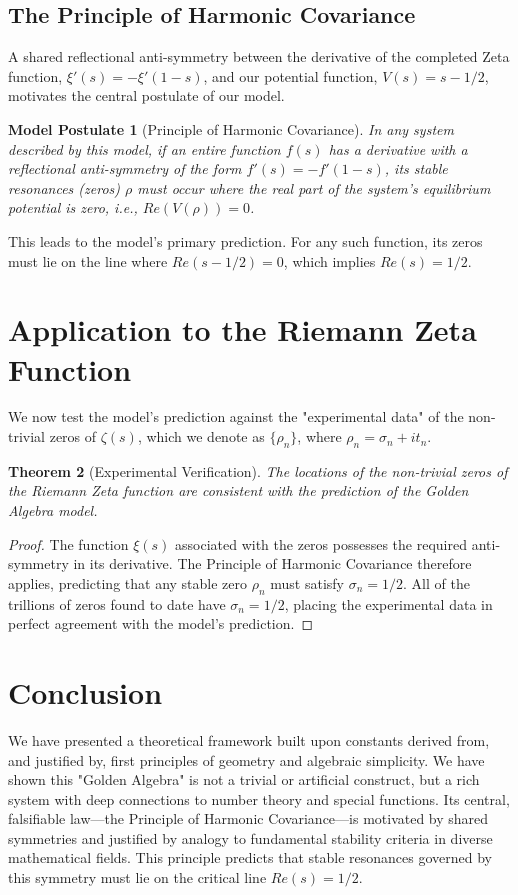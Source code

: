 \documentclass[12pt, letterpaper]{article}
\newtheorem{theorem}{Theorem}[section]
\newtheorem{postulate}[theorem]{Model Postulate}
\begin{document}
\subsection{The Principle of Harmonic Covariance}
A shared reflectional anti-symmetry between the derivative of the completed Zeta function, $\xi'(s)=-\xi'(1-s)$, and our potential function, $V(s)=s-1/2$, motivates the central postulate of our model.
\begin{postulate}[Principle of Harmonic Covariance]
In any system described by this model, if an entire function $f(s)$ has a derivative with a reflectional anti-symmetry of the form $f'(s)=-f'(1-s)$, its stable resonances (zeros) $\rho$ must occur where the real part of the system's equilibrium potential is zero, i.e., $Re(V(\rho))=0$.
\end{postulate}
This leads to the model's primary prediction. For any such function, its zeros must lie on the line where $Re(s-1/2)=0$, which implies $Re(s)=1/2$.

\section{Application to the Riemann Zeta Function}
We now test the model's prediction against the "experimental data" of the non-trivial zeros of $\zeta(s)$, which we denote as $\{\rho_{n}\}$, where $\rho_{n}=\sigma_{n}+it_{n}$.

\begin{theorem}[Experimental Verification]
The locations of the non-trivial zeros of the Riemann Zeta function are consistent with the prediction of the Golden Algebra model.
\end{theorem}
\begin{proof}
The function $\xi(s)$ associated with the zeros possesses the required anti-symmetry in its derivative. The Principle of Harmonic Covariance therefore applies, predicting that any stable zero $\rho_{n}$ must satisfy $\sigma_{n}=1/2$. All of the trillions of zeros found to date have $\sigma_{n}=1/2$, placing the experimental data in perfect agreement with the model's prediction.
\end{proof}

\section{Conclusion}
We have presented a theoretical framework built upon constants derived from, and justified by, first principles of geometry and algebraic simplicity. We have shown this "Golden Algebra" is not a trivial or artificial construct, but a rich system with deep connections to number theory and special functions. Its central, falsifiable law---the Principle of Harmonic Covariance---is motivated by shared symmetries and justified by analogy to fundamental stability criteria in diverse mathematical fields. This principle predicts that stable resonances governed by this symmetry must lie on the critical line $Re(s)=1/2$.
\end{document}
